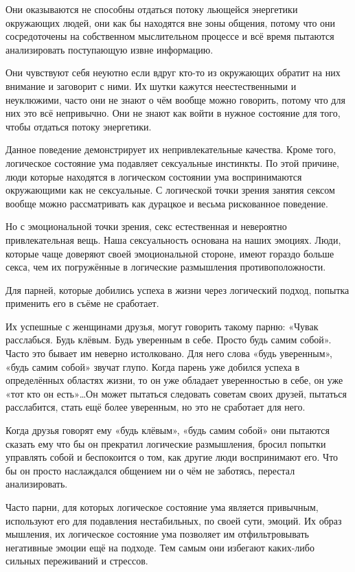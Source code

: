 Они оказываются не способны отдаться потоку льющейся энергетики окружающих людей, они как бы находятся вне зоны общения, потому что они сосредоточены на собственном мыслительном процессе и всё время пытаются анализировать поступающую извне информацию.

Они чувствуют себя неуютно если вдруг кто-то из окружающих обратит на них внимание и заговорит с ними. Их шутки кажутся неестественными и неуклюжими, часто они не знают о чём вообще можно говорить, потому что для них это всё непривычно. Они не знают как войти в нужное состояние для того, чтобы отдаться потоку энергетики.

Данное поведение демонстрирует их непривлекательные качества. Кроме того, логическое состояние ума подавляет сексуальные инстинкты. По этой причине, люди которые находятся в логическом состоянии ума воспринимаются окружающими как не сексуальные. С логической точки зрения занятия сексом вообще можно рассматривать как дурацкое и весьма рискованное поведение.

Но с эмоциональной точки зрения, секс естественная и невероятно привлекательная вещь. Наша сексуальность основана на наших эмоциях. Люди, которые чаще доверяют своей эмоциональной стороне, имеют гораздо больше секса, чем их погружённые в логические размышления противоположности.

Для парней, которые добились успеха в жизни через логический подход, попытка применить его в съёме не сработает.

Их успешные с женщинами друзья, могут говорить такому парню: «Чувак расслабься. Будь клёвым. Будь уверенным в себе. Просто будь самим собой». Часто это бывает им неверно истолковано. Для него слова «будь уверенным», «будь самим собой» звучат глупо. Когда парень уже добился успеха в определённых областях жизни, то он уже обладает уверенностью в себе, он уже «тот кто он есть»\ldots Он может пытаться следовать советам своих друзей, пытаться расслабится, стать ещё более уверенным, но это не сработает для него.

Когда друзья говорят ему «будь клёвым», «будь самим собой» они пытаются сказать ему что бы он прекратил логические размышления, бросил попытки управлять собой и беспокоится о том, как другие люди воспринимают его. Что бы он просто наслаждался общением ни о чём не заботясь, перестал анализировать.

Часто парни, для которых логическое состояние ума является привычным, используют его для подавления нестабильных, по своей сути, эмоций. Их образ мышления, их логическое состояние ума позволяет им отфильтровывать негативные эмоции ещё на подходе. Тем самым они избегают каких-либо сильных переживаний и стрессов.

